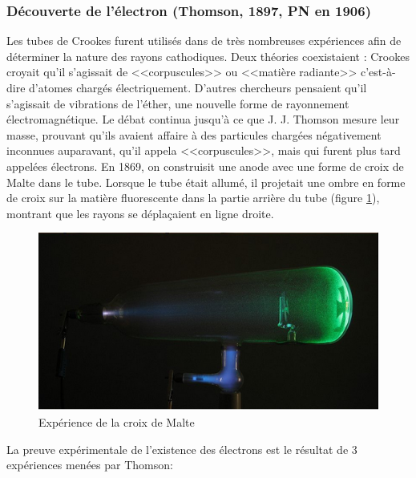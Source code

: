 \subsubsection{Découverte de l'électron (Thomson, 1897, PN en 1906)}

Les tubes de Crookes furent utilisés dans de très nombreuses expériences afin de déterminer la nature des rayons cathodiques. Deux théories coexistaient : Crookes croyait qu'il s'agissait de <<corpuscules>> ou <<matière radiante>> c'est-à-dire d'atomes chargés électriquement. D'autres chercheurs pensaient qu'il s'agissait de vibrations de l'éther, une nouvelle forme de rayonnement électromagnétique. Le débat continua jusqu'à ce que J. J. Thomson mesure leur masse, prouvant qu'ils avaient affaire à des particules chargées négativement inconnues auparavant, qu'il appela <<corpuscules>>, mais qui furent plus tard appelées électrons. En 1869, on construisit une anode avec une forme de croix de Malte dans le tube. Lorsque le tube était allumé, il projetait une ombre en forme de croix sur la matière fluorescente dans la partie arrière du tube (figure \ref{fig:croix_de_malte}), montrant que les rayons se déplaçaient en ligne droite.

\begin{figure}[ht]
    \centering
    \includegraphics[scale=0.60]{Images1/croixmalte.PNG}
    \caption{Expérience de la croix de Malte}
    \label{fig:croix_de_malte}
\end{figure}

La preuve expérimentale de l'existence des électrons est le résultat de 3 expériences menées par Thomson:

